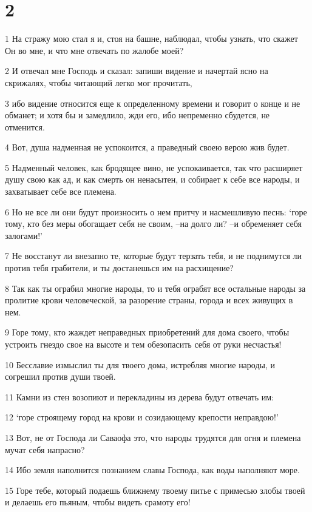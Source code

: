 \chapter{2}

\par 1 На стражу мою стал я и, стоя на башне, наблюдал, чтобы узнать, что скажет Он во мне, и что мне отвечать по жалобе моей?
\par 2 И отвечал мне Господь и сказал: запиши видение и начертай ясно на скрижалях, чтобы читающий легко мог прочитать,
\par 3 ибо видение относится еще к определенному времени и говорит о конце и не обманет; и хотя бы и замедлило, жди его, ибо непременно сбудется, не отменится.
\par 4 Вот, душа надменная не успокоится, а праведный своею верою жив будет.
\par 5 Надменный человек, как бродящее вино, не успокаивается, так что расширяет душу свою как ад, и как смерть он ненасытен, и собирает к себе все народы, и захватывает себе все племена.
\par 6 Но не все ли они будут произносить о нем притчу и насмешливую песнь: `горе тому, кто без меры обогащает себя не своим, --на долго ли? --и обременяет себя залогами!'
\par 7 Не восстанут ли внезапно те, которые будут терзать тебя, и не поднимутся ли против тебя грабители, и ты достанешься им на расхищение?
\par 8 Так как ты ограбил многие народы, то и тебя ограбят все остальные народы за пролитие крови человеческой, за разорение страны, города и всех живущих в нем.
\par 9 Горе тому, кто жаждет неправедных приобретений для дома своего, чтобы устроить гнездо свое на высоте и тем обезопасить себя от руки несчастья!
\par 10 Бесславие измыслил ты для твоего дома, истребляя многие народы, и согрешил против души твоей.
\par 11 Камни из стен возопиют и перекладины из дерева будут отвечать им:
\par 12 `горе строящему город на крови и созидающему крепости неправдою!'
\par 13 Вот, не от Господа ли Саваофа это, что народы трудятся для огня и племена мучат себя напрасно?
\par 14 Ибо земля наполнится познанием славы Господа, как воды наполняют море.
\par 15 Горе тебе, который подаешь ближнему твоему питье с примесью злобы твоей и делаешь его пьяным, чтобы видеть срамоту его!

